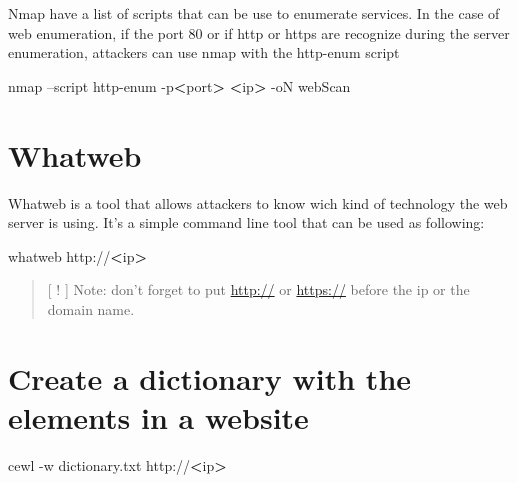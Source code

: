 \documentclass{assets/ipesethesis}
\newenvironment{Shaded}{\begin{snugshade}}{\end{snugshade}}
\newcommand{\ExtensionTok}[1]{#1}
\newcommand{\FunctionTok}[1]{\textcolor[rgb]{0.00,0.00,0.00}{#1}}
\newcommand{\NormalTok}[1]{#1}
\newcommand{\OperatorTok}[1]{\textcolor[rgb]{0.81,0.36,0.00}{\textbf{#1}}}
\begin{document}
Nmap have a list of scripts that can be use to enumerate services. In the case of web enumeration,
if the port 80 or if http or https are recognize during the server enumeration, attackers can use nmap with the
http-enum script

\begin{Shaded}
\begin{Highlighting}[]
\FunctionTok{nmap}\NormalTok{ --script http-enum -p}\OperatorTok{<}\NormalTok{port}\OperatorTok{>} \OperatorTok{<}\NormalTok{ip}\OperatorTok{>}\NormalTok{ -oN webScan}
\end{Highlighting}
\end{Shaded}

\hypertarget{whatweb}{%
\section*{Whatweb}\label{whatweb}}

Whatweb is a tool that allows attackers to know wich kind of technology the web server is using. It's a simple command line tool
that can be used as following:

\begin{Shaded}
\begin{Highlighting}[]
\ExtensionTok{whatweb}\NormalTok{ http://}\OperatorTok{<}\NormalTok{ip}\OperatorTok{>}
\end{Highlighting}
\end{Shaded}

\begin{quote}
{[} ! {]} Note: don't forget to put \url{http://} or \url{https://} before the ip or the domain name.
\end{quote}

\hypertarget{create-a-dictionary-with-the-elements-in-a-website}{%
\section*{Create a dictionary with the elements in a website}\label{create-a-dictionary-with-the-elements-in-a-website}}

\begin{Shaded}
\begin{Highlighting}[]
\ExtensionTok{cewl}\NormalTok{ -w dictionary.txt http://}\OperatorTok{<}\NormalTok{ip}\OperatorTok{>}
\end{Highlighting}
\end{Shaded}
\end{document}
